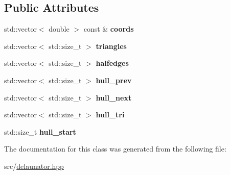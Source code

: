 \subsection*{Public Attributes}
\begin{DoxyCompactItemize}
\item 
\mbox{\label{classdelaunator_1_1Delaunator_ac48ad29af151d66885120872bf46f750}} 
std\+::vector$<$ double $>$ const  \& {\bfseries coords}
\item 
\mbox{\label{classdelaunator_1_1Delaunator_a6b613da33302f09aaea8fd74663d61cb}} 
std\+::vector$<$ std\+::size\+\_\+t $>$ {\bfseries triangles}
\item 
\mbox{\label{classdelaunator_1_1Delaunator_aff04629e1166358e4f2d43ed1e6524ef}} 
std\+::vector$<$ std\+::size\+\_\+t $>$ {\bfseries halfedges}
\item 
\mbox{\label{classdelaunator_1_1Delaunator_a9d0f92cb1eee39f5ac80f65495d543c3}} 
std\+::vector$<$ std\+::size\+\_\+t $>$ {\bfseries hull\+\_\+prev}
\item 
\mbox{\label{classdelaunator_1_1Delaunator_a8e6c50f7a0ff8c8b1f6e62c92004f57c}} 
std\+::vector$<$ std\+::size\+\_\+t $>$ {\bfseries hull\+\_\+next}
\item 
\mbox{\label{classdelaunator_1_1Delaunator_af9da27b2b5f8dc5b916b474078dd093a}} 
std\+::vector$<$ std\+::size\+\_\+t $>$ {\bfseries hull\+\_\+tri}
\item 
\mbox{\label{classdelaunator_1_1Delaunator_a28717862d3ea8ae531ee2dc7fb57b639}} 
std\+::size\+\_\+t {\bfseries hull\+\_\+start}
\end{DoxyCompactItemize}


The documentation for this class was generated from the following file\+:\begin{DoxyCompactItemize}
\item 
src/\hyperlink{delaunator_8hpp}{delaunator.\+hpp}\end{DoxyCompactItemize}
